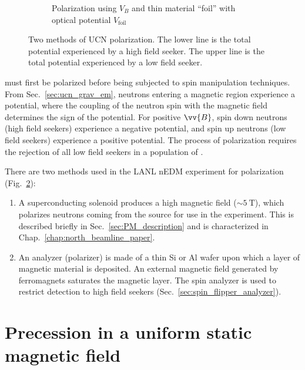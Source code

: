 \begin{figure}
\begin{subfigure}{.5\textwidth}
  \caption{Polarization using $V_B$ and thin \newline material ``foil'' with optical potential $V_\text{foil}$}\label{subfig:polarization_foil}
\end{subfigure}
\caption
{Two methods of UCN polarization.  The lower line is the total potential experienced by a high field seeker.  The upper line is the total potential experienced by a low field seeker.}
\label{fig:polarization_methods}
\end{figure}

\ucn must first be polarized before being subjected to spin manipulation techniques. From Sec.~\ref{sec:ucn_grav_em}, neutrons entering a magnetic region experience a potential, where the coupling of the neutron spin with the magnetic field determines the sign of the potential. For positive $\vv{B}$, spin down neutrons (high field seekers) experience a negative potential, and spin up neutrons (low field seekers) experience a positive potential. The process of polarization requires the rejection of all low field seekers in a population of \ucn.

There are two methods used in the LANL nEDM experiment for \ucn polarization (Fig.~\ref{fig:polarization_methods}): 
%
\begin{enumerate}
    \item A superconducting solenoid produces a high magnetic field ($\sim \qty{5}{\tesla}$), which polarizes neutrons coming from the \ucn source for use in the experiment. This is described briefly in Sec.~\ref{sec:PM_description} and is characterized in Chap.~\ref{chap:north_beamline_paper}.
    \item An analyzer (polarizer) is made of a thin Si or Al wafer upon which a layer of magnetic material is deposited. An external magnetic field generated by ferromagnets saturates the magnetic layer. The spin analyzer is used to restrict \ucn detection to high field seekers (Sec.~\ref{sec:spin_flipper_analyzer}).
\end{enumerate}


\section{Precession in a uniform static magnetic field\label{sec:larmor}}



